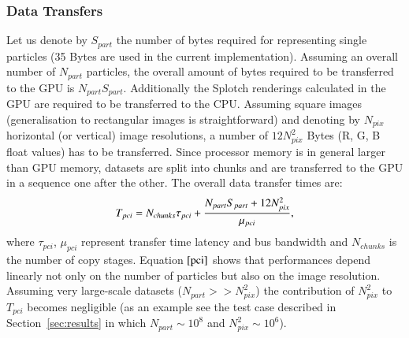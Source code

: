 \documentclass[1p]{elsarticle}
\begin{document}


\subsubsection{Data Transfers}
Let us denote by $S_{part}$ the number of bytes required for representing single particles (35 Bytes are used in the current implementation). Assuming an overall number of $N_{part}$ particles, the overall amount of bytes required to be transferred to the GPU is $N_{part} S_{part}$. Additionally the Splotch renderings calculated in the GPU are required to be transferred to the CPU. Assuming square images (generalisation to rectangular images is straightforward) and denoting by $N_{pix}$ horizontal (or vertical) image resolutions, a number of $12 N_{pix}^2$ Bytes (R, G, B float values) has to be transferred. 
Since processor memory is in general larger than GPU memory,
datasets are split into chunks and are transferred to the GPU in a sequence one after the other. The overall data transfer times are:
\begin{equation}\label{pci}
T_{pci} =  N_{chunks} \tau_{pci} + {N_{part} S_{part} + 12 N_{pix}^2 \over 
\mu_{pci}},
\end{equation}
where $\tau_{pci}$, $\mu_{pci}$ represent transfer time latency and bus bandwidth and $N_{chunks}$ is the number of copy stages. Equation $\eqref{pci}$ shows that performances depend linearly not only on the number of particles but also on the image resolution. Assuming very large-scale datasets ($N_{part} >> N_{pix}^2$) the contribution of $N_{pix}^2$ to $T_{pci}$ becomes negligible (as an example see the test case described in Section~\ref{sec:results} in which $N_{part} \sim 10^8$
and $N_{pix}^2 \sim 10^6$).
\end{document}
